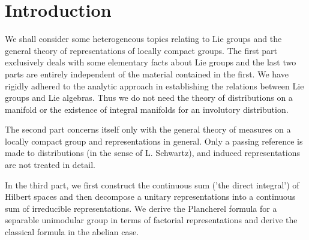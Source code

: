 \chapter{Introduction}


We shall consider some heterogeneous topics relating to Lie groups and
the general theory of representations of locally compact groups. The
first part exclusively deals with some elementary facts about Lie
groups and the last two parts are entirely independent of the material
contained in the first. We have rigidly adhered to the analytic
approach in establishing the relations between Lie groups and Lie
algebras. Thus we do not need the theory of distributions on a
manifold or the existence of integral manifolds for an involutory
distribution. 

The second part concerns itself only with the general theory of
measures on a locally compact group and representations in
general. Only a passing reference is made to distributions (in the
sense of L. Schwartz), and induced representations are not treated in
detail. 

In the third part, we first construct the continuous sum ('the direct
integral') of Hilbert spaces and then decompose a unitary
representations into a continuous sum of irreducible
representations. We derive the Plancherel formula for a separable
unimodular group in terms of factorial representations and derive the
classical formula in the abelian case. 
